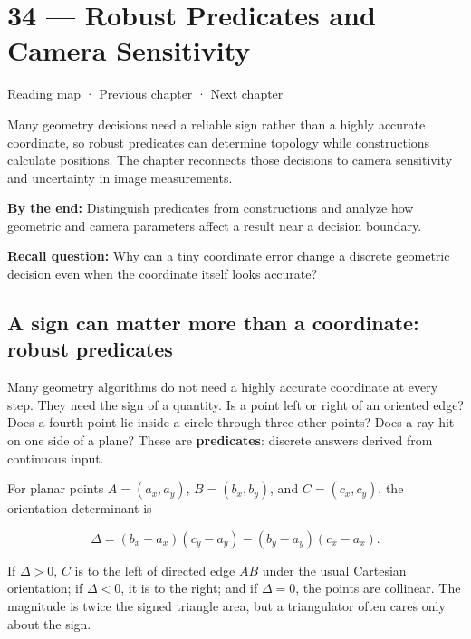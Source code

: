 \hypertarget{02-foundations-ii-ch034}{}
\chapter{34 --- Robust Predicates and Camera Sensitivity}\label{02-foundations-ii-ch034-robust-predicates-and-camera-sensitivity}

\hyperref[volume-reading-map]{Reading map} · \hyperref[02-foundations-ii-ch033-projection-clipping-and-raster-sampling]{Previous chapter} · \hyperref[02-foundations-ii-ch035-camera-extrinsics-and-projection-geometry]{Next chapter}

Many geometry decisions need a reliable sign rather than a highly accurate coordinate, so robust predicates can determine topology while constructions calculate positions. The chapter reconnects those decisions to camera sensitivity and uncertainty in image measurements.

\textbf{By the end:} Distinguish predicates from constructions and analyze how geometric and camera parameters affect a result near a decision boundary.

\textbf{Recall question:} Why can a tiny coordinate error change a discrete geometric decision even when the coordinate itself looks accurate?

\section{A sign can matter more than a coordinate: robust predicates}\label{02-foundations-ii-ch034-a-sign-can-matter-more-than-a-coordinate-robust-predicates}

Many geometry algorithms do not need a highly accurate coordinate at every step. They need the sign of a quantity. Is a point left or right of an oriented edge? Does a fourth point lie inside a circle through three other points? Does a ray hit on one side of a plane? These are \textbf{predicates}: discrete answers derived from continuous input.

For planar points \(A=(a_x,a_y)\), \(B=(b_x,b_y)\), and \(C=(c_x,c_y)\), the orientation determinant is

\[
\Delta = (b_x-a_x)(c_y-a_y)-(b_y-a_y)(c_x-a_x).
\]

If \(\Delta>0\), \(C\) is to the left of directed edge \(AB\) under the usual Cartesian orientation; if \(\Delta<0\), it is to the right; and if \(\Delta=0\), the points are collinear. The magnitude is twice the signed triangle area, but a triangulator often cares only about the sign.

